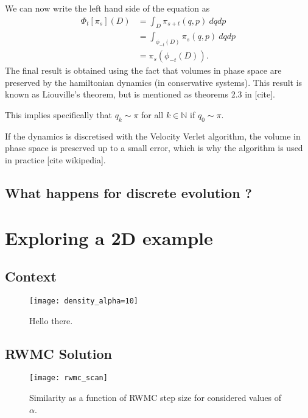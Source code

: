 \documentclass[a4paper, 12pt,oneside]{article}
\begin{document}
		We can now write the left hand side of the equation as
		\begin{align}
			\Phi_t[\pi_s](D)&=\int_D \pi_{s+t}(q,p)\ dqdp \\
				&=\int_{\phi_{-t}(D)}\pi_{s}(q,p)\ dqdp \\
				&=\pi_s(\phi_{-t}(D)).
		\end{align}
		The final result is obtained using the fact that volumes in phase space are preserved by the hamiltonian dynamics (in conservative systems). This result is known as Liouville's theorem, but is mentioned as theorems 2.3 in [cite].

		This implies specifically that $q_k\sim\pi$ for all $k\in\mathbb{N}$ if $q_0\sim \pi$. 

		If the dynamics is discretised with the Velocity Verlet algorithm, the volume in phase space is preserved up to a small error, which is why the algorithm is used in practice [cite wikipedia]. 
        \subsection{What happens for discrete evolution ?}
	\section{Exploring a 2D example}
		\subsection{Context}
		\lipsum[1]
        \begin{figure}[htb]
            \centering
                \vspace{0em}
                \texttt{[image: density\_alpha=10]}
                \caption{Hello there.}
                \label{fig:density-alpha=10}
        \end{figure}
		\subsection{RWMC Solution}
        \begin{figure}[htb]
            \centering
                \vspace{0em}
                \texttt{[image: rwmc\_scan]}
                \caption{Similarity as a function of RWMC step size for considered values of $\alpha$.}
                \label{fig:rwmc-scan}
        \end{figure}
		\lipsum[1]
\end{document}
